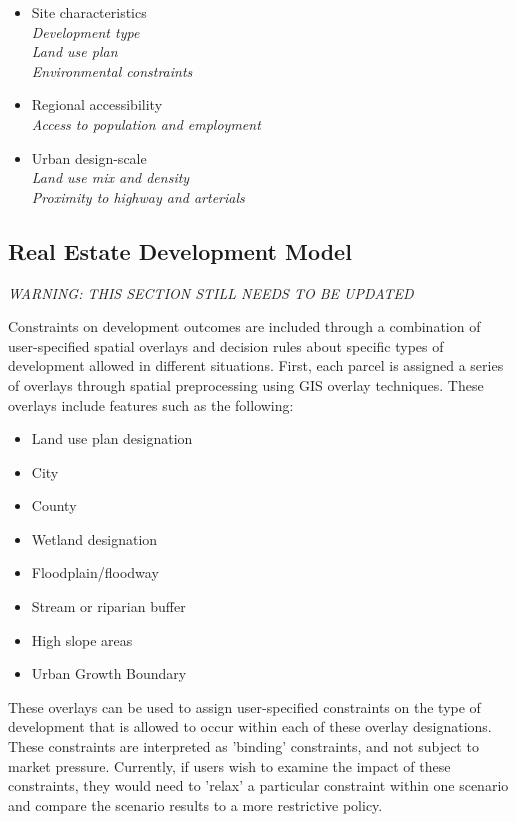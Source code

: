 \begin{itemize}

\item Site characteristics \\
\emph{Development type \\
Land use plan \\
Environmental constraints}

\item Regional accessibility \\
\emph{Access to population and employment}

\item Urban design-scale \\
\emph{Land use mix and density \\
Proximity to highway and arterials}

\end{itemize}

\subsection{Real Estate Development Model}
\label{real-estate-development-model}

\emph{WARNING: THIS SECTION STILL NEEDS TO BE UPDATED}

Constraints on development outcomes are included through a
combination of user-specified spatial overlays and decision rules
about specific types of development allowed in different
situations.  First, each parcel is assigned a series of overlays
through spatial preprocessing using GIS overlay techniques.  These
overlays include features such as the following:

\begin{itemize}
\item  Land use plan designation
\item  City
\item  County
\item  Wetland designation
\item  Floodplain/floodway
\item  Stream or riparian buffer
\item  High slope areas
\item  Urban Growth Boundary
\end{itemize}


These overlays can be used to assign user-specified constraints on
the type of development that is allowed to occur within each of
these overlay designations.  These constraints are interpreted as
'binding' constraints, and not subject to
market pressure. Currently, if users wish to examine the impact of
these constraints, they would need to 'relax' a particular
constraint within one scenario and compare the scenario results to
a more restrictive policy.

